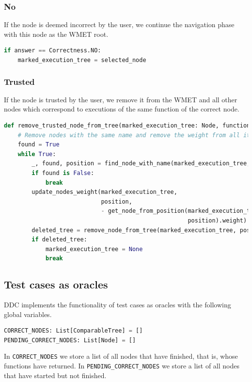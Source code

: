 \subsubsection{No}
If the node is deemed incorrect by the user, we continue the navigation phase with this node as the WMET root.
\begin{lstlisting}[language=Python, caption=Incorrect node action]
if answer == Correctness.NO:
    marked_execution_tree = selected_node
\end{lstlisting}
\subsubsection{Trusted}
If the node is trusted by the user, we remove it from the WMET and all other nodes which correspond to executions of the same function of the correct node.
\begin{lstlisting}[language=Python, caption=Trusted node action]
def remove_trusted_node_from_tree(marked_execution_tree: Node, function_name: str):
    # Remove nodes with the same name and remove the weight from all its parents
    found = True
    while True:
        _, found, position = find_node_with_name(marked_execution_tree, [], function_name)
        if found is False:
            break
        update_nodes_weight(marked_execution_tree,
                            position,
                            - get_node_from_position(marked_execution_tree,
                                                     position).weight)
        deleted_tree = remove_node_from_tree(marked_execution_tree, position)
        if deleted_tree:
            marked_execution_tree = None
            break
\end{lstlisting}

\subsection{Test cases as oracles}
DDC implements the functionality of test cases as oracles with the following global variables.
\begin{lstlisting}[language=Python, caption=Global variables related to using test cases as oracles]
CORRECT_NODES: List[ComparableTree] = []
PENDING_CORRECT_NODES: List[Node] = []
\end{lstlisting}

In \verb|CORRECT_NODES| we store a list of all nodes that have finished, that is, whose functions have returned.
In \verb|PENDING_CORRECT_NODES| we store a list of all nodes that have started but not finished.


